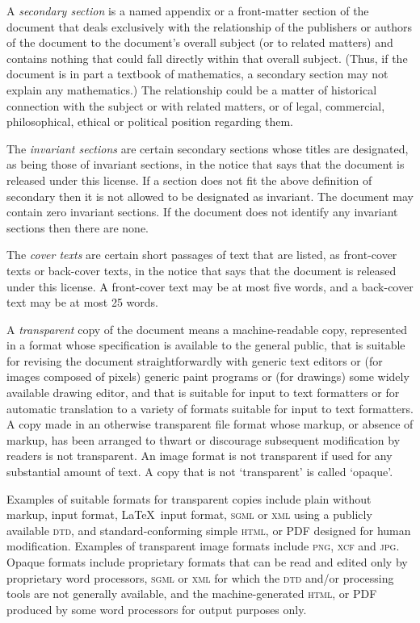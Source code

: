 \begin{multicols}{3}
A \emph{secondary section} is a named appendix or a front-matter section of the document that deals exclusively with the relationship of the publishers or authors of the document to the document's overall subject (or to related matters) and contains nothing that could fall directly within that overall subject. (Thus, if the document is in part a textbook of mathematics, a secondary section may not explain any mathematics.) The relationship could be a matter of historical connection with the subject or with related matters, or of legal, commercial, philosophical, ethical or political position regarding them.

The \emph{invariant sections} are certain secondary sections whose titles are designated, as being those of invariant sections, in the notice that says that the document is released under this license. If a section does not fit the above definition of secondary then it is not allowed to be designated as invariant. The document may contain zero invariant sections. If the document does not identify any invariant sections then there are none.

The \emph{cover texts} are certain short passages of text that are listed, as front-cover texts or back-cover texts, in the notice that says that the document is released under this license. A front-cover text may be at most five words, and a back-cover text may be at most 25 words.

A \emph{transparent} copy of the document means a machine-readable copy, represented in a format whose specification is available to the general public, that is suitable for revising the document straightforwardly with generic text editors or (for images composed of pixels) generic paint programs or (for drawings) some widely available drawing editor, and that is suitable for input to text formatters or for automatic translation to a variety of formats suitable for input to text formatters. A copy made in an otherwise transparent file format whose markup, or absence of markup, has been arranged to thwart or discourage subsequent modification by readers is not transparent. An image format is not transparent if used for any substantial amount of text. A copy that is not \enquote*{transparent} is called \enquote*{opaque}.

\sloppypar Examples of suitable formats for transparent copies include plain \ascii without markup, \texinfo input format, \LaTeX\ input format, \textsc{sgml} or \textsc{xml} using a publicly available \textsc{dtd}, and standard-conforming simple \textsc{html}, \PS or PDF designed for human modification. Examples of transparent image formats include \textsc{png}, \textsc{xcf} and \textsc{jpg}. Opaque formats include proprietary formats that can be read and edited only by proprietary word processors, \textsc{sgml} or \textsc{xml} for which the \textsc{dtd} and\slash or processing tools are not generally available, and the machine-generated \textsc{html}, \PS or PDF produced by some word processors for output purposes only.


\end{multicols}
